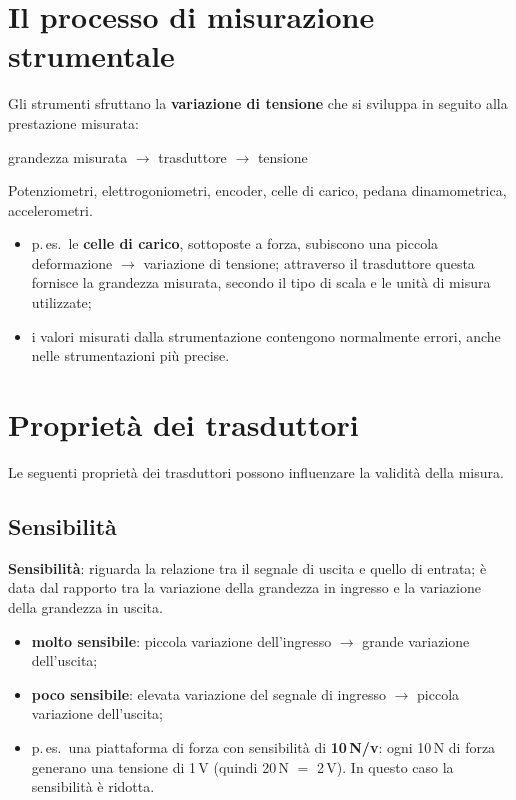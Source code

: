 \section{Il processo di misurazione strumentale}

Gli strumenti sfruttano la \textbf{variazione di tensione} che si sviluppa in seguito alla
prestazione misurata:

\begin{center}
grandezza misurata $\rightarrow$ trasduttore $\rightarrow$ tensione
\end{center}

Potenziometri, elettrogoniometri, encoder, celle di carico, pedana dinamometrica, accelerometri.

\begin{itemize}
  \item p.\,es.\ le \textbf{celle di carico}, sottoposte a forza, subiscono una piccola
    deformazione $\rightarrow$ variazione di tensione; attraverso il trasduttore questa fornisce la
    grandezza misurata, secondo il tipo di scala e le unità di misura utilizzate;
  \item i valori misurati dalla strumentazione contengono normalmente errori, anche nelle
    strumentazioni più precise.
\end{itemize}

\section{Proprietà dei trasduttori}

Le seguenti proprietà dei trasduttori possono influenzare la validità della misura.

\subsection{Sensibilità}

\textbf{Sensibilità}: riguarda la relazione tra il segnale di uscita e quello di entrata; è data dal
rapporto tra la variazione della grandezza in ingresso e la variazione della grandezza in uscita.

\begin{itemize}
  \item \textbf{molto sensibile}: piccola variazione dell'ingresso $\rightarrow$ grande variazione
    dell'uscita;
  \item \textbf{poco sensibile}: elevata variazione del segnale di ingresso $\rightarrow$ piccola
    variazione dell'uscita;
  \item p.\,es.\ una piattaforma di forza con sensibilità di \textbf{10\,N/v}: ogni 10\,N di forza
    generano una tensione di 1\,V (quindi 20\,N $=$ 2\,V). In questo caso la sensibilità è ridotta.
\end{itemize}

